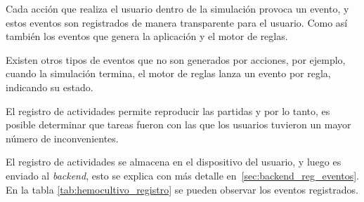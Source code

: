 Cada acción que realiza el usuario dentro de la simulación provoca un evento, y
estos eventos son registrados de manera transparente para el usuario. Como así 
también los eventos que genera la aplicación y el motor de reglas.

Existen otros tipos de eventos que no son generados por acciones, por ejemplo,
cuando la simulación termina, el motor de reglas lanza un evento por regla,
indicando su estado.

El registro de actividades permite reproducir las partidas y por lo tanto, es 
posible determinar que tareas fueron con las que los usuarios tuvieron un 
mayor número de inconvenientes.


El registro de actividades se almacena en el dispositivo del usuario, y luego
es enviado al \emph{backend}, esto se explica con más detalle
en~\ref{sec:backend_reg_eventos}. En la tabla \ref{tab:hemocultivo_registro} 
se pueden observar los eventos registrados.



